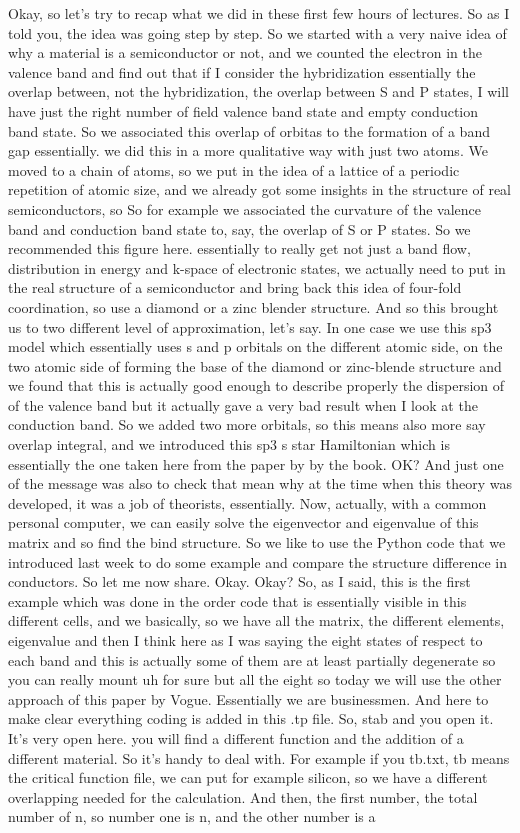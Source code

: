 Okay, so let's try to recap what we did in these first few hours of lectures. So as I told you, the idea was going step by step. So we started with a very naive idea of why a material is a semiconductor or not, and we counted the electron in the valence band and find out that if I consider the hybridization essentially the overlap between, not the hybridization, the overlap between S and P states, I will have just the right number of field valence band state and empty conduction band state. So we associated this overlap of orbitas to the formation of a band gap essentially. we did this in a more qualitative way with just two atoms. We moved to a chain of atoms, so we put in the idea of a lattice of a periodic repetition of atomic size, and we already got some insights in the structure of real semiconductors, so So for example we associated the curvature of the valence band and conduction band state to, say, the overlap of S or P states. So we recommended this figure here. essentially to really get not just a band flow, distribution in energy and k-space of electronic states, we actually need to put in the real structure of a semiconductor and bring back this idea of four-fold coordination, so use a diamond or a zinc blender structure. And so this brought us to two different level of approximation, let's say. In one case we use this sp3 model which essentially uses s and p orbitals on the different atomic side, on the two atomic side of forming the base of the diamond or zinc-blende structure and we found that this is actually good enough to describe properly the dispersion of of the valence band but it actually gave a very bad result when I look at the conduction band. So we added two more orbitals, so this means also more say overlap integral, and we introduced this sp3 s star Hamiltonian which is essentially the one taken here from the paper by by the book. OK? And just one of the message was also to check that mean why at the time when this theory was developed, it was a job of theorists, essentially. Now, actually, with a common personal computer, we can easily solve the eigenvector and eigenvalue of this matrix and so find the bind structure. So we like to use the Python code that we introduced last week to do some example and compare the structure difference in conductors. So let me now share. Okay. Okay? So, as I said, this is the first example which was done in the order code that is essentially visible in this different cells, and we basically, so we have all the matrix, the different elements, eigenvalue and then I think here as I was saying the eight states of respect to each band and this is actually some of them are at least partially degenerate so you can really mount uh for sure but all the eight so today we will use the other approach of this paper by Vogue. Essentially we are businessmen. And here to make clear everything coding is added in this .tp file. So, stab and you open it. It's very open here. you will find a different function and the addition of a different material. So it's handy to deal with. For example if you tb.txt, tb means the critical function file, we can put for example silicon, so we have a different overlapping needed for the calculation. And then, the first number, the total number of n, so number one is n, and the other number is a 